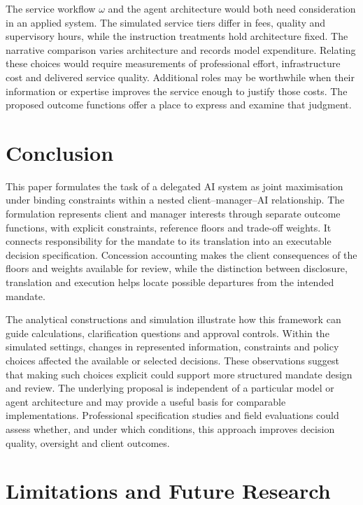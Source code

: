 \documentclass[oneside,10pt,english]{swissi}
\begin{document}
The service workflow $\omega$ and the agent architecture would both need consideration in an applied system. The simulated service tiers differ in fees, quality and supervisory hours, while the instruction treatments hold architecture fixed. The narrative comparison varies architecture and records model expenditure. Relating these choices would require measurements of professional effort, infrastructure cost and delivered service quality. Additional roles may be worthwhile when their information or expertise improves the service enough to justify those costs. The proposed outcome functions offer a place to express and examine that judgment.

\section{Conclusion}\label{sec:conclusion}

This paper formulates the task of a delegated AI system as joint maximisation under binding constraints within a nested client--manager--AI relationship. The formulation represents client and manager interests through separate outcome functions, with explicit constraints, reference floors and trade-off weights. It connects responsibility for the mandate to its translation into an executable decision specification. Concession accounting makes the client consequences of the floors and weights available for review, while the distinction between disclosure, translation and execution helps locate possible departures from the intended mandate.

The analytical constructions and simulation illustrate how this framework can guide calculations, clarification questions and approval controls. Within the simulated settings, changes in represented information, constraints and policy choices affected the available or selected decisions. These observations suggest that making such choices explicit could support more structured mandate design and review. The underlying proposal is independent of a particular model or agent architecture and may provide a useful basis for comparable implementations. Professional specification studies and field evaluations could assess whether, and under which conditions, this approach improves decision quality, oversight and client outcomes.

\section{Limitations and Future Research}\label{sec:limitations-future}
\end{document}
